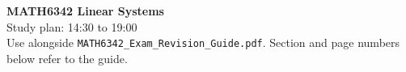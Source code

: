\documentclass[11pt,a4paper]{article}
\begin{document}
\begin{center}
{\LARGE\bfseries\color{navy}MATH6342 Linear Systems}\\[4pt]
{\Large Study plan: 14:30 to 19:00}\\[4pt]
{\color{teal}Use alongside \texttt{MATH6342\_Exam\_Revision\_Guide.pdf}. Section and page numbers below refer to the guide.}
\end{center}

\end{document}
